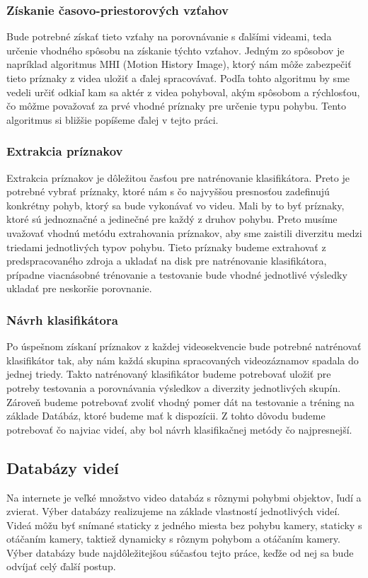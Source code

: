 \subsubsection{Získanie časovo-priestorových vzťahov}
Bude potrebné získať tieto vzťahy na porovnávanie s ďalšími videami, teda určenie vhodného spôsobu na získanie týchto vzťahov. Jedným zo spôsobov je napríklad algoritmus MHI (Motion History Image), ktorý nám môže zabezpečiť tieto príznaky z videa uložiť a ďalej spracovávať. Podľa tohto algoritmu by sme vedeli určiť odkiaľ kam sa aktér z videa pohyboval, akým spôsobom a rýchlosťou, čo môžme považovať za prvé vhodné príznaky pre určenie typu pohybu.\cite{c3} Tento algoritmus si bližšie popíšeme ďalej v tejto práci.

\subsubsection{Extrakcia príznakov}
Extrakcia príznakov je dôležitou časťou pre natrénovanie klasifikátora. Preto je potrebné vybrať príznaky, ktoré nám s čo najvyššou presnosťou zadefinujú konkrétny pohyb, ktorý sa bude vykonávať vo videu. Mali by to byť príznaky, ktoré sú jednoznačné a jedinečné pre každý z druhov pohybu. Preto musíme uvažovať vhodnú metódu extrahovania príznakov, aby sme zaistili diverzitu medzi triedami jednotlivých typov pohybu.  Tieto príznaky budeme extrahovať z predspracovaného zdroja a ukladať na disk pre natrénovanie klasifikátora, prípadne viacnásobné trénovanie a testovanie bude vhodné jednotlivé výsledky ukladať pre neskoršie porovnanie.

\subsubsection{Návrh klasifikátora}
Po úspešnom získaní príznakov z každej videosekvencie bude potrebné natrénovať klasifikátor tak, aby nám každá skupina spracovaných videozáznamov spadala do jednej triedy. Takto natrénovaný klasifikátor budeme potrebovať uložiť pre potreby testovania a porovnávania výsledkov a diverzity jednotlivých skupín. Zároveň budeme potrebovať zvoliť vhodný pomer dát na testovanie a tréning na základe Datábáz, ktoré budeme mať k dispozícii. Z tohto dôvodu budeme potrebovať čo najviac videí, aby bol návrh klasifikačnej metódy čo najpresnejší.


\subsection{Databázy videí}
Na internete je veľké množstvo video databáz s rôznymi pohybmi objektov, ľudí a zvierat.
Výber databázy realizujeme na základe vlastností jednotlivých videí. Videá môžu byť snímané staticky z jedného miesta bez pohybu kamery, staticky s otáčaním kamery, taktiež dynamicky s rôznym pohybom a otáčaním kamery. Výber databázy bude najdôležitejšou súčasťou tejto práce, keďže od nej sa bude odvíjať celý ďalší postup.
